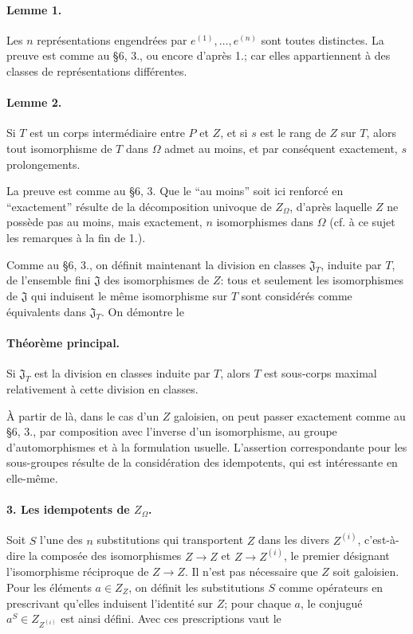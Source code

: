 \paragraph{Lemme 1.}
Les \(n\) représentations engendrées par \(e^{(1)},\ldots,e^{(n)}\) sont toutes distinctes. La preuve est comme au \S 6, 3., ou encore d'après 1.; car elles appartiennent à des classes de représentations différentes.

\paragraph{Lemme 2.}
Si \(T\) est un corps intermédiaire entre \(P\) et \(Z\), et si \(s\) est le rang de \(Z\) sur \(T\), alors tout isomorphisme de \(T\) dans \(\Omega\) admet au moins, et par conséquent exactement, \(s\) prolongements.

La preuve est comme au \S 6, 3. Que le ``au moins'' soit ici renforcé en ``exactement'' résulte de la décomposition univoque de \(Z_\Omega\), d'après laquelle \(Z\) ne possède pas au moins, mais exactement, \(n\) isomorphismes dans \(\Omega\) (cf. à ce sujet les remarques à la fin de 1.).

Comme au \S 6, 3., on définit maintenant la division en classes \(\mathfrak J_T\), induite par \(T\), de l'ensemble fini \(\mathfrak J\) des isomorphismes de \(Z\): tous et seulement les isomorphismes de \(\mathfrak J\) qui induisent le même isomorphisme sur \(T\) sont considérés comme équivalents dans \(\mathfrak J_T\). On démontre le

\paragraph{Théorème principal.}
Si \(\mathfrak J_T\) est la division en classes induite par \(T\), alors \(T\) est sous-corps maximal relativement à cette division en classes.

À partir de là, dans le cas d'un \(Z\) galoisien, on peut passer exactement comme au \S 6, 3., par composition avec l'inverse d'un isomorphisme, au groupe d'automorphismes et à la formulation usuelle. L'assertion correspondante pour les sous-groupes résulte de la considération des idempotents, qui est intéressante en elle-même.

\paragraph{3. Les idempotents de \(Z_\Omega\).}
Soit \(S\) l'une des \(n\) substitutions qui transportent \(Z\) dans les divers \(Z^{(i)}\), c'est-à-dire la composée des isomorphismes \(Z\to Z\) et \(Z\to Z^{(i)}\), le premier désignant l'isomorphisme réciproque de \(Z\to Z\). Il n'est pas nécessaire que \(Z\) soit galoisien. Pour les éléments \(a\in Z_Z\), on définit les substitutions \(S\) comme opérateurs en prescrivant qu'elles induisent l'identité sur \(Z\); pour chaque \(a\), le conjugué \(a^S\in Z_{Z^{(i)}}\) est ainsi défini. Avec ces prescriptions vaut le

